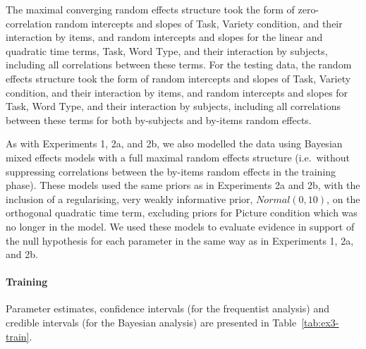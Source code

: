 \documentclass[doc,floatsintext]{apa6}
\let\oldparagraph\paragraph
\renewcommand{\paragraph}[1]{\oldparagraph{#1}\mbox{}}
\begin{document}
The maximal converging random effects structure took the form of
zero-correlation random intercepts and slopes of Task, Variety
condition, and their interaction by items, and random intercepts and
slopes for the linear and quadratic time terms, Task, Word Type, and
their interaction by subjects, including all correlations between these
terms. For the testing data, the random effects structure took the form
of random intercepts and slopes of Task, Variety condition, and their
interaction by items, and random intercepts and slopes for Task, Word
Type, and their interaction by subjects, including all correlations
between these terms for both by-subjects and by-items random effects.

As with Experiments 1, 2a, and 2b, we also modelled the data using
Bayesian mixed effects models with a full maximal random effects
structure (i.e.~without suppressing correlations between the by-items
random effects in the training phase). These models used the same priors
as in Experiments 2a and 2b, with the inclusion of a regularising, very
weakly informative prior, \(Normal(0, 10)\), on the orthogonal quadratic
time term, excluding priors for Picture condition which was no longer in
the model. We used these models to evaluate evidence in support of the
null hypothesis for each parameter in the same way as in Experiments 1,
2a, and 2b.

\paragraph{Training}\label{training-3}

Parameter estimates, confidence intervals (for the frequentist analysis)
and credible intervals (for the Bayesian analysis) are presented in
Table~\ref{tab:ex3-train}.

\newpage
\end{document}
